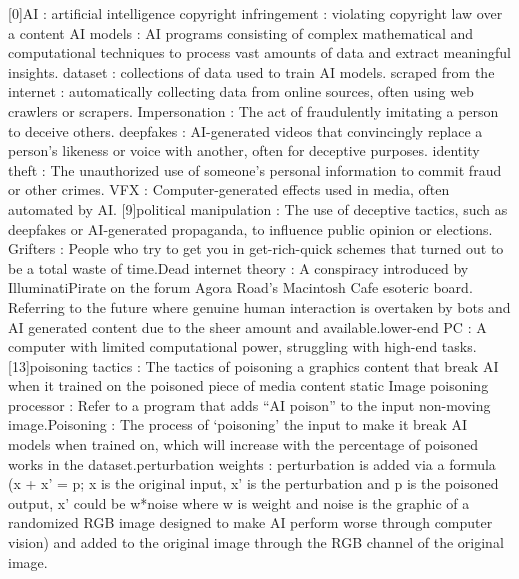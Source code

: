 [0]AI : artificial intelligence \newline
[1]copyright infringement : violating copyright law over a content \newline 
[2]AI models : AI programs consisting of complex mathematical and computational techniques to process vast amounts of data and extract meaningful insights. \newline
[3]dataset : collections of data used to train AI models. \newline
[4]scraped from the internet : automatically collecting data from online sources, often using web crawlers or scrapers. \newline
[5]Impersonation : The act of fraudulently imitating a person to deceive others. \newline
[6]deepfakes : AI-generated videos that convincingly replace a person’s likeness or voice with another, often for deceptive purposes. \newline
[7]identity theft : The unauthorized use of someone’s personal information to commit fraud or other crimes. \newline
[8]VFX : Computer-generated effects used in media, often automated by AI.
[9]political manipulation : The use of deceptive tactics, such as deepfakes or AI-generated propaganda, to influence public opinion or elections. \newline
[10]Grifters : People who try to get you in get-rich-quick schemes that turned out to be a total waste of time.\newline
[11]Dead internet theory : A conspiracy introduced by IlluminatiPirate on the forum Agora Road's Macintosh Cafe esoteric board. Referring to the future where genuine human interaction is overtaken by bots and AI generated content due to the sheer amount and available.\newline
[12]lower-end PC : A computer with limited computational power, struggling with high-end tasks.
[13]poisoning tactics : The tactics of poisoning a graphics content that break AI when it trained on the poisoned piece of media content \newline
[14]static Image poisoning processor : Refer to a program that adds “AI poison” to the input non-moving image.\newline
[15]Poisoning : The process of ‘poisoning’ the input to make it break AI models when trained on, which will increase with the percentage of poisoned works in the dataset.\newline
[16]perturbation weights : perturbation is added via a formula (x + x’ = p; x is the original input, x’ is the perturbation and p is the poisoned output, x’ could be w*noise where w is weight and noise is the graphic of a randomized RGB image designed to make AI perform worse through computer vision) and added to the original image through the RGB channel of the original image.
